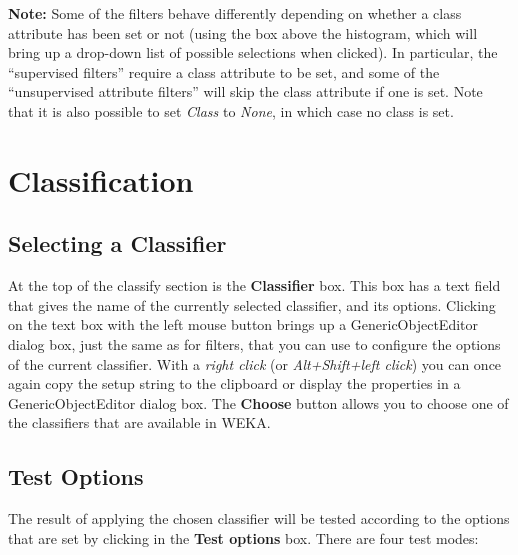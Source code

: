 \documentclass[a4paper]{article}
\begin{document}
\noindent \textbf{Note:} Some of the filters behave differently
depending on whether a class attribute has been set or not (using the
box above the histogram, which will bring up a drop-down list of
possible selections when clicked). In particular, the ``supervised
filters'' require a class attribute to be set, and some of the
``unsupervised attribute filters'' will skip the class attribute if
one is set. Note that it is also possible to set {\em Class} to {\em
None}, in which case no class is set.

\newpage

\section{Classification}

\begin{center}
\end{center}

\subsection{Selecting a Classifier}

\label{sec:classifier}
At the top of the classify section is the \textbf{Classifier}
box. This box has a text field that gives the name of the currently
selected classifier, and its options. Clicking on the text box with 
the left mouse button brings up a GenericObjectEditor dialog box, 
just the same as for filters, that you can use to configure the options 
of the current classifier. With a \textit{right click} (or 
\textit{Alt+Shift+left click}) you can once again copy 
the setup string to the clipboard or display the properties in a 
GenericObjectEditor dialog box.
The \textbf{Choose} button allows you to choose one of the classifiers
that are available in WEKA.

\subsection{Test Options}

The result of applying the chosen classifier will be tested according to the
options that are set by clicking in the \textbf{Test options} box.  There are
four test modes:
\end{document}

